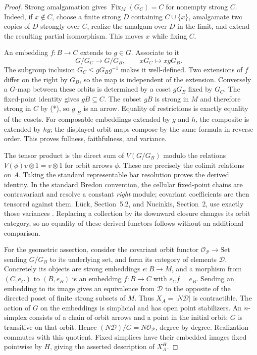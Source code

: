 \begin{proof}
Strong amalgamation gives $\operatorname{Fix}_M(G_C)=C$ for
nonempty strong $C$. Indeed, if $x\notin C$, choose a finite
strong $D$ containing $C\cup\{x\}$, amalgamate two copies of
$D$ strongly over $C$, realize the amalgam over $D$ in the
limit, and extend the resulting partial isomorphism. This
moves $x$ while fixing $C$.

An embedding $f:B\to C$ extends to $g\in G$. Associate to it
\[
 G/G_C\longrightarrow G/G_B,\qquad xG_C\longmapsto xgG_B.
\]
The subgroup inclusion $G_C\leq gG_Bg^{-1}$ makes it
well-defined. Two extensions of $f$ differ on the right by
$G_B$, so the map is independent of the extension. Conversely a
$G$-map between these orbits is determined by a coset $gG_B$
fixed by $G_C$. The fixed-point identity gives $gB\subseteq C$.
The subset $gB$ is strong in $M$ and therefore strong in $C$
by (*), so $g|_B$ is an arrow. Equality of restrictions is
exactly equality of the cosets. For composable embeddings
extended by $g$ and $h$, the composite is extended by $hg$;
the displayed orbit maps compose by the same formula in reverse
order. This proves fullness, faithfulness, and variance.

The tensor product is the direct sum of $V(G/G_B)$ modulo
the relations $V(\phi)v\otimes1=v\otimes1$ for orbit arrows
$\phi$. These are precisely the colimit relations on $A$.
Taking the standard representable bar resolution proves the
derived identity. In the standard Bredon convention, the
cellular fixed-point chains are contravariant and resolve a
constant \emph{right} module; covariant coefficients are then
tensored against them. L\"uck, Section~5.2, and Nucinkis,
Section~2, use exactly those variances
\cite{ABLueck2005,ABNucinkis2004}. Replacing a collection by its
downward closure changes its orbit category, so no equality of
these derived functors follows without an additional comparison.

For the geometric assertion, consider the covariant orbit
functor $\mathcal O_{\mathcal P}\to\mathrm{Set}$ sending $G/G_B$
to its underlying set, and form its category of elements
$\mathcal D$. Concretely its objects are strong embeddings
$e:B\to M$, and a morphism from $(C,e_C)$ to $(B,e_B)$ is an
embedding $f:B\to C$ with $e_Cf=e_B$. Sending an embedding to its
image gives an equivalence from $\mathcal D$ to the opposite
of the directed poset of finite strong subsets of $M$. Thus
$X_A=|N\mathcal D|$ is contractible. The action of $G$ on the
embeddings is simplicial and has open point stabilizers. An
$n$-simplex consists of a chain of orbit arrows and a point in
the initial orbit; $G$ is transitive on that orbit. Hence
$(N\mathcal D)/G=N\mathcal O_{\mathcal P}$, degree by degree.
Realization commutes with this quotient. Fixed simplices have
their embedded images fixed pointwise by $H$, giving the
asserted description of $X_A^H$.


\end{proof}
